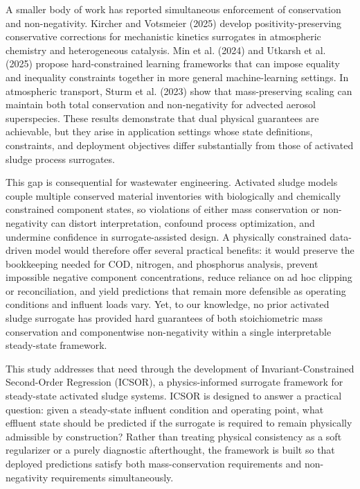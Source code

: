 \documentclass[11pt]{article}
\begin{document}
A smaller body of work has reported simultaneous enforcement of conservation and non-negativity. Kircher and Votsmeier (2025) develop positivity-preserving conservative corrections for mechanistic kinetics surrogates in atmospheric chemistry and heterogeneous catalysis. Min et al. (2024) and Utkarsh et al. (2025) propose hard-constrained learning frameworks that can impose equality and inequality constraints together in more general machine-learning settings. In atmospheric transport, Sturm et al. (2023) show that mass-preserving scaling can maintain both total conservation and non-negativity for advected aerosol superspecies. These results demonstrate that dual physical guarantees are achievable, but they arise in application settings whose state definitions, constraints, and deployment objectives differ substantially from those of activated sludge process surrogates.

This gap is consequential for wastewater engineering. Activated sludge models couple multiple conserved material inventories with biologically and chemically constrained component states, so violations of either mass conservation or non-negativity can distort interpretation, confound process optimization, and undermine confidence in surrogate-assisted design. A physically constrained data-driven model would therefore offer several practical benefits: it would preserve the bookkeeping needed for COD, nitrogen, and phosphorus analysis, prevent impossible negative component concentrations, reduce reliance on ad hoc clipping or reconciliation, and yield predictions that remain more defensible as operating conditions and influent loads vary. Yet, to our knowledge, no prior activated sludge surrogate has provided hard guarantees of both stoichiometric mass conservation and componentwise non-negativity within a single interpretable steady-state framework.

This study addresses that need through the development of Invariant-Constrained Second-Order Regression (ICSOR), a physics-informed surrogate framework for steady-state activated sludge systems. ICSOR is designed to answer a practical question: given a steady-state influent condition and operating point, what effluent state should be predicted if the surrogate is required to remain physically admissible by construction? Rather than treating physical consistency as a soft regularizer or a purely diagnostic afterthought, the framework is built so that deployed predictions satisfy both mass-conservation requirements and non-negativity requirements simultaneously.
\end{document}
